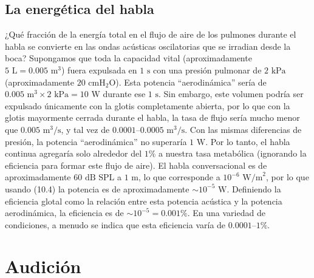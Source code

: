 \documentclass[12pt]{book}
\begin{document}
\subsection{La energética del habla}

¿Qué fracción de la energía total en el flujo de aire de los pulmones durante el habla se convierte en las ondas acústicas oscilatorias que se irradian desde la boca? Supongamos que toda la capacidad vital (aproximadamente $5\text{ L} = 0.005\text{ m}^3$) fuera expulsada en $1\text{ s}$ con una presión pulmonar de $2\text{ kPa}$ (aproximadamente $20\text{ cmH}_2\text{O}$). Esta potencia ``aerodinámica'' sería de $0.005\text{ m}^3 \times 2\text{ kPa} = 10\text{ W}$ durante ese $1\text{ s}$. Sin embargo, este volumen podría ser expulsado únicamente con la glotis completamente abierta, por lo que con la glotis mayormente cerrada durante el habla, la tasa de flujo sería mucho menor que $0.005\text{ m}^3/\text{s}$, y tal vez de $0.0001\text{--}0.0005\text{ m}^3/\text{s}$. Con las mismas diferencias de presión, la potencia ``aerodinámica'' no superaría $1\text{ W}$. Por lo tanto, el habla continua agregaría solo alrededor del $1\%$ a nuestra tasa metabólica (ignorando la eficiencia para formar este flujo de aire). El habla conversacional es de aproximadamente $60\text{ dB SPL}$ a $1\text{ m}$, lo que corresponde a $10^{-6}\text{ W/m}^2$, por lo que usando (10.4) la potencia es de aproximadamente $\sim 10^{-5}\text{ W}$. Definiendo la eficiencia glotal como la relación entre esta potencia acústica y la potencia aerodinámica, la eficiencia es de $\sim 10^{-5} = 0.001\%$. En una variedad de condiciones, a menudo se indica que esta eficiencia varía de $0.0001\text{--}1\%$.



\section{Audición}
\end{document}
